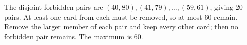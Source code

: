 The disjoint forbidden pairs are $(40,80),(41,79),\ldots,(59,61)$, giving $20$ pairs. At least one card from each must be removed, so at most $60$ remain. Remove the larger member of each pair and keep every other card; then no forbidden pair remains. The maximum is $\boxed{60}$.
